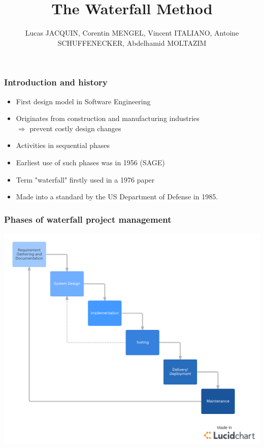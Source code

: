 \documentclass{beamer}
\title{The Waterfall Method}
\author{Lucas JACQUIN, Corentin MENGEL, Vincent ITALIANO, Antoine SCHUFFENECKER, Abdelhamid MOLTAZIM}
\begin{document}
\begin{frame}    
    
    \maketitle

\end{frame}

\begin{frame}
    \frametitle{Introduction and history}
    \begin{itemize}
        \setlength\itemsep{1em}
        \item First design model in Software Engineering \pause
        \item Originates from construction and manufacturing industries \\
        \quad\quad$\Rightarrow$ prevent costly design changes\pause
        \item Activities in sequential phases \pause
        \item Earliest use of such phases was in 1956 (SAGE) \pause
        \item Term "waterfall" firstly used in a 1976 paper \pause
        \item Made into a standard by the US Department of Defense in 1985.
    \end{itemize}
\end{frame}

\begin{frame}
    \frametitle{Phases of waterfall project management}
    \includegraphics[scale=0.25]{Images/WaterfallDiagram.png}
\end{frame}
\end{document}
